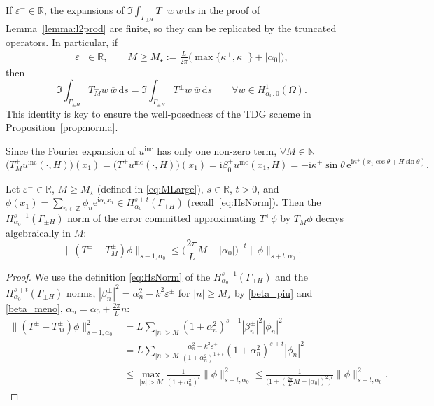 \documentclass[a4paper,10pt]{article}
\newcommand{\IR}{{\mathbb R}}
\newcommand{\IN}{{\mathbb N}}
\newcommand{\IZ}{{\mathbb Z}}
\newcommand{\ri}{{\mathrm i}}
\newcommand{\re}{{\mathrm e}}
\newcommand{\rd}{{\,\mathrm d}}
\newcommand{\inc}{{\mathrm{inc}}}
\newcommand{\cw}{{\overline{w}}}
\newcommand{\GpmH}{{\Gamma_{\pm H}}}
\begin{document}
\begin{rem} \label{imag_rem}
If $\varepsilon^-\in\IR$, the expansions of $\Im \int_\GpmH T^\pm w\, \cw\rd s$ in the proof of Lemma~\ref{lemma:l2prod} are finite, so they can be replicated by the truncated operators.
In particular, if 
\begin{align}\label{eq:MLarge}
	\varepsilon^-\in\IR, \qquad 
	M\ge{M_\star:=} \frac L{2\pi}\Big(\max\{\kappa^+,\kappa^-\} +|\alpha_0|\Big),
\end{align}
then 
$$
\Im \int_\GpmH T^\pm_M w\, \cw\rd s=\Im \int_\GpmH T^\pm w\, \cw\rd s
\qquad \forall w\in H^1_{\alpha_0,0}(\Omega).
$$
This identity is key to ensure the well-posedness of the TDG scheme in Proposition~\ref{prop:norma}.
\end{rem}

Since the Fourier expansion of $u^\inc$ has only one non-zero term, $\forall M\in\IN$ 
$$\big(T^+_M u^\inc(\cdot,H)\big)(x_1)
=\big(T^+ u^\inc(\cdot,H)\big)(x_1)
=\ri\beta_0^+u^\inc(x_1,H)
=-\ri\kappa^+\sin\theta\, \re^{\ri\kappa^+(x_1\cos\theta+H\sin\theta)}.$$

\begin{prop}\label{prop:TminusTM}
Let $\varepsilon^-\in\IR$, $M\ge M_\star$ (defined in \eqref{eq:MLarge}), $s\in\IR$, $t>0$, and
$\phi(x_1)=\sum_{n\in\IZ}\phi_n\re^{\ri\alpha_nx_1}\in H^{s+t}_{\alpha_0}(\GpmH)$ (recall~\eqref{eq:HsNorm}). 
Then the $H^{s-1}_{\alpha_0}(\GpmH)$ norm of the error committed approximating $T^\pm\phi$ by $T^\pm_M\phi$ decays algebraically in $M$:
$$
\|(T^\pm-T^\pm_M)\phi\|_{s-1,\alpha_0}
\le \Big(\frac{2\pi}LM-|\alpha_0|\Big)^{-t}\|\phi\|_{s+t,\alpha_0}.
$$
\end{prop}
\begin{proof}
We use the definition \eqref{eq:HsNorm} of the $H_{\alpha_0}^{s-1}(\GpmH)$ and the $H_{\alpha_0}^{s+t}(\GpmH)$ norms,
$|\beta_n^\pm|^2=\alpha_n^2-k^2\varepsilon^\pm$ for $|n|\ge M_\star$ by \eqref{beta_piu} and \eqref{beta_meno}, 
$\alpha_n=\alpha_0+\frac{2\pi}Ln$:
\begin{align*}
	\|(T^\pm-T^\pm_M)\phi\|_{s-1,\alpha_0}^2
	&=L\sum_{|n|>M}(1+\alpha_n^2)^{s-1} |\beta_n^\pm|^2 |\phi_n|^2
	\\
	&=L\sum_{|n|>M}\frac{\alpha_n^2-k^2\varepsilon^\pm}{(1+\alpha_n^2)^{1+t}} (1+\alpha_n^2)^{s+t}|\phi_n|^2
	\\
	&\le\max_{|n|>M}\frac1{(1+\alpha_n^2)^t} \|\phi\|_{s+t,\alpha_0}^2
	\le\frac1{\big(1+(\frac{2\pi}L M-|\alpha_0|)^2\big)^t} \|\phi\|_{s+t,\alpha_0}^2.
\end{align*}
\end{proof}
\end{document}
